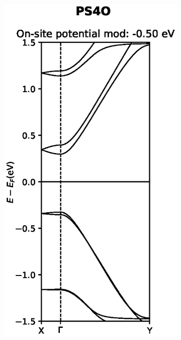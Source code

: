 \begin{figure}[h]
\begin{subfigure}[b]{0.3\textwidth}
		\vspace{-2.5\baselineskip}
		\caption{}
		\label{PS4Odevnomod}
	\end{subfigure}
	~
	\begin{subfigure}[b]{0.3\textwidth}
		\centering
		\includegraphics[width=\textwidth]{Figures/PS4Omod.eps}
		\vspace{-2.5\baselineskip}

\end{subfigure}
\end{figure}
